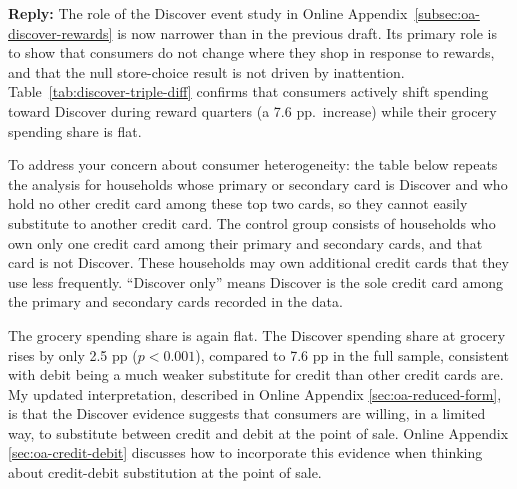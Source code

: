 \documentclass[main.tex]{subfiles}
\begin{document}
\begin{refsection}
\textbf{Reply:} The role of the Discover event study in Online Appendix~\ref{subsec:oa-discover-rewards} is now narrower than in the previous draft.
Its primary role is to show that consumers do not change where they shop in response to rewards, and that the null store-choice result is not driven by inattention.
Table~\ref{tab:discover-triple-diff} confirms that consumers actively shift spending toward Discover during reward quarters (a 7.6 pp.\ increase) while their grocery spending share is flat.

To address your concern about consumer heterogeneity: the table below repeats the analysis for households whose primary or secondary card is Discover and who hold no other credit card among these top two cards, so they cannot easily substitute to another credit card.
The control group consists of households who own only one credit card among their primary and secondary cards, and that card is not Discover.
These households may own additional credit cards that they use less frequently. ``Discover only'' means Discover is the sole credit card among the primary and secondary cards recorded in the data.

The grocery spending share is again flat.
The Discover spending share at grocery rises by only 2.5 pp ($p < 0.001$), compared to 7.6 pp in the full sample, consistent with debit being a much weaker substitute for credit than other credit cards are.
My updated interpretation, described in Online Appendix \ref{sec:oa-reduced-form}, is that the Discover evidence suggests that consumers are willing, in a limited way, to substitute between credit and debit at the point of sale. 
Online Appendix \ref{sec:oa-credit-debit} discusses how to incorporate this evidence when thinking about credit-debit substitution at the point of sale.

\begin{table}[ht!]
\small
\caption*{Effect of Discover cashback rewards on payment composition: Discover-only credit card holders}
\scriptsize
\centering \resizebox{\textwidth}{!}{}
\end{table}


\end{refsection}
\end{document}
